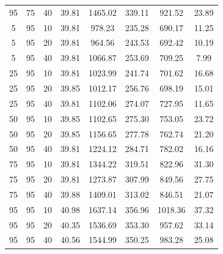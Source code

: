 \begin{table}[H]
\begin{tabular}{ccc|c|c|c|c|c}
95 & 75 & 40 & \cellcolor{gray!80}39.81 & \cellcolor{gray!1}1465.02 & \cellcolor{gray!1}339.11 & \cellcolor{gray!1}921.52 & 23.89\\
5 & 95 & 10 & \cellcolor{gray!80}39.81 & \cellcolor{gray!38}978.23 & \cellcolor{gray!26}235.28 & \cellcolor{gray!71}690.17 & 11.25\\
5 & 95 & 20 & \cellcolor{gray!80}39.81 & \cellcolor{gray!41}964.56 & \cellcolor{gray!18}243.53 & \cellcolor{gray!70}692.42 & 10.19\\
5 & 95 & 40 & \cellcolor{gray!80}39.81 & \cellcolor{gray!24}1066.87 & \cellcolor{gray!9}253.69 & \cellcolor{gray!65}709.25 & 7.99\\
25 & 95 & 10 & \cellcolor{gray!80}39.81 & \cellcolor{gray!31}1023.99 & \cellcolor{gray!20}241.74 & \cellcolor{gray!68}701.62 & 16.68\\
25 & 95 & 20 & \cellcolor{gray!80}39.85 & \cellcolor{gray!33}1012.17 & \cellcolor{gray!6}256.76 & \cellcolor{gray!69}698.19 & 15.01\\
25 & 95 & 40 & \cellcolor{gray!80}39.81 & \cellcolor{gray!18}1102.06 & \cellcolor{gray!1}274.07 & \cellcolor{gray!60}727.95 & 11.65\\
50 & 95 & 10 & \cellcolor{gray!80}39.85 & \cellcolor{gray!18}1102.65 & \cellcolor{gray!1}275.30 & \cellcolor{gray!52}753.05 & 23.72\\
50 & 95 & 20 & \cellcolor{gray!80}39.85 & \cellcolor{gray!9}1156.65 & \cellcolor{gray!1}277.78 & \cellcolor{gray!49}762.74 & 21.20\\
50 & 95 & 40 & \cellcolor{gray!80}39.81 & \cellcolor{gray!1}1224.12 & \cellcolor{gray!1}284.71 & \cellcolor{gray!43}782.02 & 16.16\\
75 & 95 & 10 & \cellcolor{gray!80}39.81 & \cellcolor{gray!1}1344.22 & \cellcolor{gray!1}319.51 & \cellcolor{gray!30}822.96 & 31.30\\
75 & 95 & 20 & \cellcolor{gray!80}39.81 & \cellcolor{gray!1}1273.87 & \cellcolor{gray!1}307.99 & \cellcolor{gray!22}849.56 & 27.75\\
75 & 95 & 40 & \cellcolor{gray!80}39.88 & \cellcolor{gray!1}1409.01 & \cellcolor{gray!1}313.02 & \cellcolor{gray!23}846.51 & 21.07\\
95 & 95 & 10 & \cellcolor{gray!69}40.98 & \cellcolor{gray!1}1637.14 & \cellcolor{gray!1}356.96 & \cellcolor{gray!1}1018.36 & 37.32\\
95 & 95 & 20 & \cellcolor{gray!75}40.35 & \cellcolor{gray!1}1536.69 & \cellcolor{gray!1}353.30 & \cellcolor{gray!1}957.62 & 33.14\\
95 & 95 & 40 & \cellcolor{gray!73}40.56 & \cellcolor{gray!1}1544.99 & \cellcolor{gray!1}350.25 & \cellcolor{gray!1}983.28 & 25.08

\end{tabular}
\end{table}
